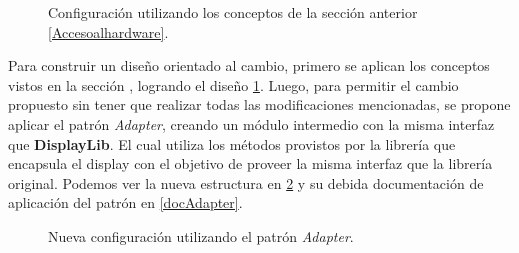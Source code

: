 \begin{figure}[h!]
\caption{Configuración utilizando los conceptos de la sección anterior \ref{Accesoalhardware}.}
\label{configUsando}
\begin{center}
\end{center}
\end{figure}

\newpage

Para construir un diseño orientado al cambio, primero se aplican los conceptos vistos en la sección , logrando el diseño \ref{configUsando}. Luego, para permitir el cambio propuesto sin tener que realizar todas las modificaciones mencionadas, se propone aplicar el patrón \textit{Adapter}, creando un módulo intermedio con la misma interfaz que \textbf{DisplayLib}. El cual utiliza los métodos provistos por la librería que encapsula el display con el objetivo de proveer la misma interfaz que la librería original. Podemos ver la nueva estructura en \ref{configNueva} y su debida documentación de aplicación del patrón en \ref{docAdapter}.

\begin{figure}[h!]
\caption{Nueva configuración utilizando el patrón \textit{Adapter}.}
\label{configNueva}
\begin{center}
\end{center}
\end{figure}

